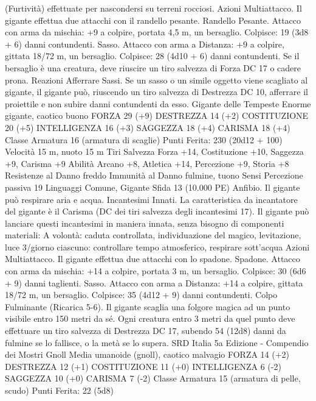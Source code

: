 \begin{multicols}{2}
(Furtività) effettuate per nascondersi su terreni rocciosi.
Azioni
Multiattacco. Il gigante effettua due attacchi con il randello pesante.
Randello Pesante. Attacco con arma da mischia: +9 a colpire,
portata 4,5 m, un bersaglio.
Colpisce: 19 (3d8 + 6) danni contundenti.
Sasso. Attacco con arma a Distanza: +9 a colpire, gittata 18/72
m, un bersaglio.
Colpisce: 28 (4d10 + 6) danni contundenti. Se il bersaglio è una
creatura, deve riuscire un tiro salvezza di Forza DC 17 o cadere
prona.
Reazioni
Afferrare Sassi. Se un sasso o un simile oggetto viene scagliato al
gigante, il gigante può, riuscendo un tiro salvezza di Destrezza DC
10, afferrare il proiettile e non subire danni contundenti da esso.
Gigante delle Tempeste
Enorme gigante, caotico buono
FORZA 29 (+9)
DESTREZZA 14 (+2)
COSTITUZIONE 20 (+5)
INTELLIGENZA 16 (+3)
SAGGEZZA 18 (+4)
CARISMA 18 (+4)
Classe Armatura 16 (armatura di scaglie)
\hspace*{0pt}\hfill{Punti Ferita}: 230 (20d12 + 100)
Velocità 15 m, nuoto 15 m
Tiri Salvezza Forza +14, Costituzione +10, Saggezza +9,
Carisma +9
Abilità Arcano +8, Atletica +14, Percezione +9, Storia +8
Resistenze al Danno freddo
Immunità al Danno fulmine, tuono
Sensi Percezione passiva 19
Linguaggi Comune, Gigante
Sfida 13 (10.000 PE)
Anfibio. Il gigante può respirare aria e acqua.
Incantesimi Innati. La caratteristica da incantatore del gigante è
il Carisma (DC dei tiri salvezza degli incantesimi 17). Il gigante
può lanciare questi incantesimi in maniera innata, senza bisogno
di componenti materiali:
A volontà: caduta controllata, individuazione del magico,
levitazione, luce
3/giorno ciascuno: controllare tempo atmosferico, respirare
sott'acqua
Azioni
Multiattacco. Il gigante effettua due attacchi con lo spadone.
Spadone. Attacco con arma da mischia: +14 a colpire, portata 3
m, un bersaglio.
Colpisce: 30 (6d6 + 9) danni taglienti.
Sasso. Attacco con arma a Distanza: +14 a colpire, gittata 18/72
m, un bersaglio.
Colpisce: 35 (4d12 + 9) danni contundenti.
Colpo Fulminante (Ricarica 5-6). Il gigante scaglia una folgore
magica ad un punto visibile entro 150 metri da sé. Ogni creatura
entro 3 metri da quel punto deve effettuare un tiro salvezza di
Destrezza DC 17, subendo 54 (12d8) danni da fulmine se lo
fallisce, o la metà se lo supera.
SRD Italia 5a Edizione - Compendio dei Mostri
Gnoll
Media umanoide (gnoll), caotico malvagio
FORZA 14 (+2)
DESTREZZA 12 (+1)
COSTITUZIONE 11 (+0)
INTELLIGENZA 6 (-2)
SAGGEZZA 10 (+0)
CARISMA 7 (-2)
Classe Armatura 15 (armatura di pelle, scudo)
\hspace*{0pt}\hfill{Punti Ferita}: 22 (5d8)

\end{multicols}
